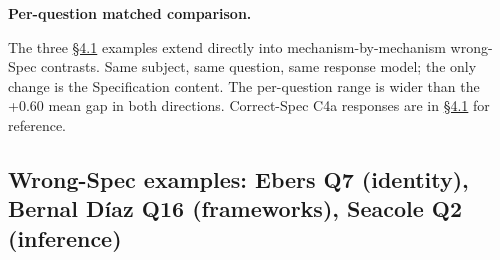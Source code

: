 \textbf{Per-question matched comparison.}

The three \hyperref[the-cross-subject-gradient-and-its-per-question-mechanism]{§4.1} examples extend directly into mechanism-by-mechanism
wrong-Spec contrasts. Same subject, same question, same response model;
the only change is the Specification content. The per-question range is
wider than the +0.60 mean gap in both directions. Correct-Spec C4a
responses are in \hyperref[the-cross-subject-gradient-and-its-per-question-mechanism]{§4.1} for reference.

\hypertarget{wrong-spec-examples-ebers-q7-identity-bernal-duxedaz-q16-frameworks-seacole-q2-inference}{%
\subsection{Wrong-Spec examples: Ebers Q7 (identity), Bernal Díaz Q16
(frameworks), Seacole Q2
(inference)}\label{wrong-spec-examples-ebers-q7-identity-bernal-duxedaz-q16-frameworks-seacole-q2-inference}}

